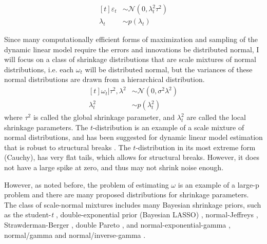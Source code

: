 \documentclass{article}
\newcommand{\paren}[1]{\ensuremath{\left(#1\right)}}
\newcommand{\dnorm}[1]{\ensuremath{\mathcal{N}\paren{#1}}}
\begin{document}

\begin{equation}
  \label{eq:4}
  \begin{aligned}[t]
    \varepsilon_{t} &\sim \dnorm{0, \lambda_{t}^{2} \tau^{2}} \\
    \lambda_{t} &\sim p(\lambda_{t})
  \end{aligned}
\end{equation}

Since many computationally efficient forms of maximization and sampling of the dynamic linear model require the errors and innovations be distributed normal, I will focus on a class of shrinkage distributions that are scale mixtures of normal distributions, i.e. each $\omega_{t}$ will be distributed normal, but the variances of these normal distributions are drawn from a hierarchical distribution.
\begin{equation}
  \label{eq:6}
  \begin{aligned}[t]
    \omega_{t} | \tau^{2}, \lambda^{2} & \sim \dnorm{0, \sigma^{2} \lambda^{2}} \\
    \lambda_{t}^{2} & \sim p(\lambda^{2}_{t})
  \end{aligned}
\end{equation}
where $\tau^{2}$ is called the global shrinkage parameter, and $\lambda_{t}^{2}$ are called the local shrinkage parameters.
The $t$-distribution is an example of a scale mixture of normal distributions, and has been suggested for dynamic linear model estimation that is robust to structural breaks \parencites{HarveyKoopman2000}{PetrisPetroneEtAl2009}.
The $t$-distribution in its most extreme form (Cauchy), has very flat tails, which allows for structural breaks.
However, it does not have a large spike at zero, and thus may not shrink noise enough.

However, as noted before, the problem of estimating $\omega$ is an example of a large-p problem and there are many proposed distributions for shrinkage parameters.
The class of scale-normal mixtures includes many Bayesian shrinkage priors, such as the student-\textit{t} \parencite{Tipping2001}, double-exponential prior (Bayesian LASSO) \parencites{LiGoel2006}{ParkCasella2008}{Hans2009}, normal-Jeffreys \parencites{FigueiredoMember2003}{BaeMallick2004}, Strawderman-Berger \parencites{Strawderman1971}{Berger1980}, double Pareto \parencite{ArmaganDunsonLee2011},  and normal-exponential-gamma \parencite{BrownGriffin2005}, normal/gamma and normal/inverse-gamma \parencites{CaronDoucet2008}{BrownGriffin2010}.
\end{document}
